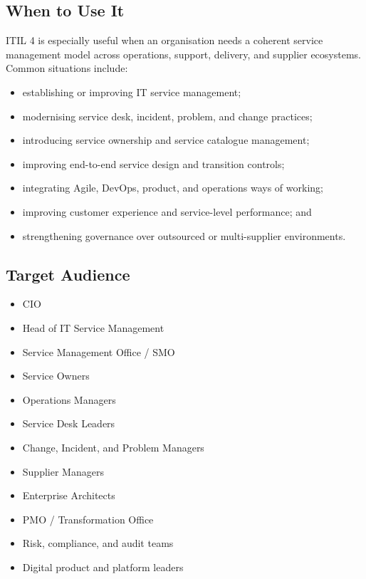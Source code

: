 \documentclass[
  letterpaper,
  DIV=11,
  numbers=noendperiod]{scrartcl}
\providecommand{\tightlist}{%
  \setlength{\itemsep}{0pt}\setlength{\parskip}{0pt}}
\begin{document}
\subsection{When to Use It}\label{when-to-use-it}

ITIL 4 is especially useful when an organisation needs a coherent
service management model across operations, support, delivery, and
supplier ecosystems. Common situations include:

\begin{itemize}
\tightlist
\item
  establishing or improving IT service management;
\item
  modernising service desk, incident, problem, and change practices;
\item
  introducing service ownership and service catalogue management;
\item
  improving end-to-end service design and transition controls;
\item
  integrating Agile, DevOps, product, and operations ways of working;
\item
  improving customer experience and service-level performance; and
\item
  strengthening governance over outsourced or multi-supplier
  environments.
\end{itemize}

\subsection{Target Audience}\label{target-audience}

\begin{itemize}
\tightlist
\item
  CIO
\item
  Head of IT Service Management
\item
  Service Management Office / SMO
\item
  Service Owners
\item
  Operations Managers
\item
  Service Desk Leaders
\item
  Change, Incident, and Problem Managers
\item
  Supplier Managers
\item
  Enterprise Architects
\item
  PMO / Transformation Office
\item
  Risk, compliance, and audit teams
\item
  Digital product and platform leaders
\end{itemize}
\end{document}
